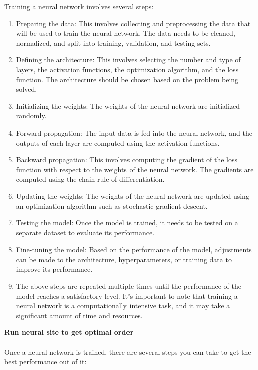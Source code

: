         Training a neural network involves several steps:
        \begin{enumerate}
            \item Preparing the data: This involves collecting and preprocessing the data that will be used to train the neural network.
            The data needs to be cleaned, normalized, and split into training, validation, and testing sets.
            \item Defining the architecture: This involves selecting the number and type of layers, the activation functions, the optimization
            algorithm, and the loss function. The architecture should be chosen based on the problem being solved.
            \item Initializing the weights: The weights of the neural network are initialized randomly.
            \item Forward propagation: The input data is fed into the neural network, and the outputs of each layer are
            computed using the activation functions.
            \item Backward propagation: This involves computing the gradient of the loss function with respect to the 
            weights of the neural network. The gradients are computed using the chain rule of differentiation.
            \item Updating the weights: The weights of the neural network are updated using an optimization algorithm such as stochastic gradient descent.
            \item Testing the model: Once the model is trained, it needs to be tested on a separate dataset to evaluate its performance.
            \item Fine-tuning the model: Based on the performance of the model, adjustments can be made to the architecture,
            hyperparameters, or training data to improve its performance.
            \item The above steps are repeated multiple times until the performance of the model reaches a satisfactory level.
            It's important to note that training a neural network is a computationally intensive task, and it may take a significant
            amount of time and resources.
        \end{enumerate}
        \textbf{Run neural site to get optimal order}\\
        \\
        Once a neural network is trained, there are several steps you can take to get the best performance out of it:
